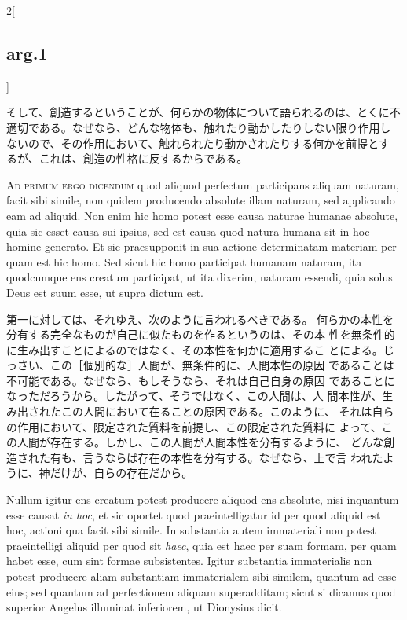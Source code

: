 \documentclass[paper=a4paper,fontsize=10pt,jafontsize=9pt,titlepage]{jlreq}
\begin{document}
\begin{paracol}{2}[\subsection{arg.1}]
\switchcolumn

そして、創造するということが、何らかの物体について語られるのは、とくに不
 適切である。なぜなら、どんな物体も、触れたり動かしたりしない限り作用し
 ないので、その作用において、触れられたり動かされたりする何かを前提とす
 るが、これは、創造の性格に反するからである。

\switchcolumn*[\subsection{ad.1}]

{\scshape Ad primum ergo dicendum} quod aliquod
 perfectum participans aliquam naturam, facit sibi simile, non quidem
 producendo absolute illam naturam, sed applicando eam ad aliquid. Non
 enim hic homo potest esse causa naturae humanae absolute, quia sic
 esset causa sui ipsius, sed est causa quod natura humana sit in hoc
 homine generato. Et sic praesupponit in sua actione determinatam
 materiam per quam est hic homo. Sed sicut hic homo participat humanam
 naturam, ita quodcumque ens creatum participat, ut ita dixerim, naturam
 essendi, quia solus Deus est suum esse, ut supra dictum est.

\switchcolumn

第一に対しては、それゆえ、次のように言われるべきである。
何らかの本性を分有する完全なものが自己に似たものを作るというのは、その本
 性を無条件的に生み出すことによるのではなく、その本性を何かに適用するこ
 とによる。じっさい、この［個別的な］人間が、無条件的に、人間本性の原因
 であることは不可能である。なぜなら、もしそうなら、それは自己自身の原因
 であることになっただろうから。したがって、そうではなく、この人間は、人
 間本性が、生み出されたこの人間において在ることの原因である。このように、
 それは自らの作用において、限定された質料を前提し、この限定された質料に
 よって、この人間が存在する。しかし、この人間が人間本性を分有するように、
 どんな創造された有も、言うならば存在の本性を分有する。なぜなら、上で言
 われたように、神だけが、自らの存在だから。

\switchcolumn*

Nullum igitur ens creatum potest producere aliquod ens absolute, nisi
 inquantum esse causat {\itshape in hoc}, et sic oportet quod
 praeintelligatur id per quod aliquid est hoc, actioni qua facit sibi
 simile.  In substantia autem immateriali non potest praeintelligi
 aliquid per quod sit {\itshape haec}, quia est haec per suam formam, per quam
 habet esse, cum sint formae subsistentes. Igitur substantia
 immaterialis non potest producere aliam substantiam immaterialem sibi
 similem, quantum ad esse eius; sed quantum ad perfectionem aliquam
 superadditam; sicut si dicamus quod superior Angelus illuminat
 inferiorem, ut Dionysius dicit.


\end{paracol}
\end{document}
